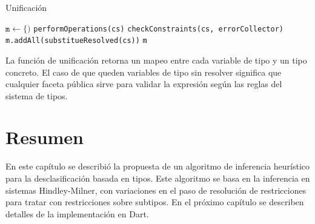 \begin{algorithm}\captionsetup{labelsep=newline}
  \centering
  \caption{Unificación}
  \label{pseudouni}
    \begin{algorithmic}[1]
          \State $\mathtt{m\gets \{)}$
            \State \texttt{performOperations(cs)}
            \State \texttt{checkConstraints(cs, errorCollector)}
            \State \texttt{m.addAll(substitueResolved(cs))}
          \EndWhile
          \State \Return \texttt{m}
      \EndFunction
    \end{algorithmic}
\end{algorithm}
\clearpage
La función de unificación retorna un mapeo entre cada variable de tipo y un tipo concreto. El caso de que queden variables de tipo sin resolver significa que cualquier faceta pública sirve para validar la expresión según las reglas del sistema de tipos.

\section*{Resumen}
En este capítulo se describió la propuesta de un algoritmo de inferencia heurístico para la desclasificación basada en tipos. Este algoritmo se basa en la inferencia en sistemas Hindley-Milner, con variaciones en el paso de resolución de restricciones para tratar con restricciones sobre subtipos. En el próximo capítulo se describen detalles de la implementación en Dart.
